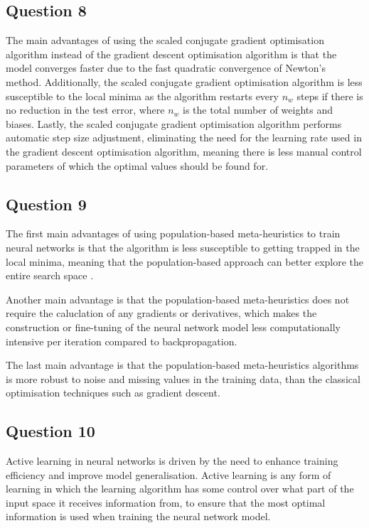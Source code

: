 \documentclass[10pt]{article}
\begin{document}
\subsection*{Question 8}

The main advantages of using the scaled conjugate gradient optimisation algorithm instead of
the gradient descent optimisation algorithm is that the model converges faster due to the
fast quadratic convergence of Newton's method. Additionally, the scaled conjugate gradient
optimisation algorithm is less susceptible to the local minima as the algorithm restarts every
$n_w$ steps if there is no reduction in the test error, where $n_w$ is the total number of
weights and biases. Lastly, the scaled conjugate gradient optimisation algorithm performs
automatic step size adjustment, eliminating the need for the learning rate used in the gradient
descent optimisation algorithm, meaning there is less manual control parameters of which
the optimal values should be found for.

\subsection*{Question 9}

The first main advantages of using population-based meta-heuristics to train neural networks is that the algorithm
is less susceptible to getting trapped in the local minima, meaning that the population-based approach
can better explore the entire search space \cite{sciencedirect_metaheuristics}.

Another main advantage is that the population-based meta-heuristics does not require the caluclation of any gradients
or derivatives, which makes the construction or fine-tuning of the neural network model less computationally intensive
per iteration compared to backpropagation.

The last main advantage is that the population-based meta-heuristics algorithms is more robust to noise and missing
values in the training data, than the classical optimisation techniques such as gradient descent.

\subsection*{Question 10}

Active learning in neural networks is driven by the need to enhance training efficiency and improve model
generalisation. Active learning is any form of learning in which the learning algorithm has some control
over what part of the input space it receives information from, to ensure that the most optimal information
is used when training the neural network model.
\end{document}
